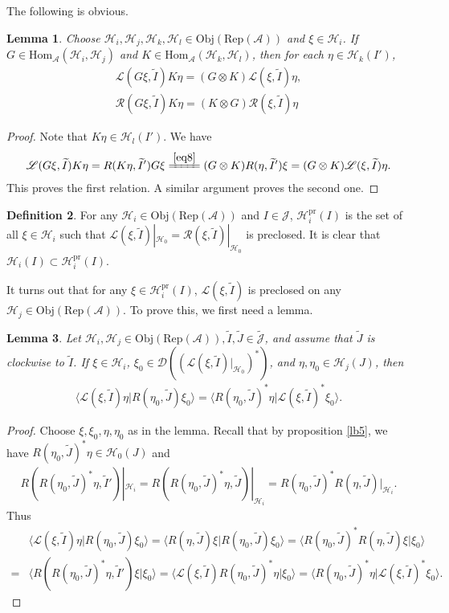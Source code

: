\documentclass[12pt,a4paper]{article}
\theoremstyle{definition}
\newtheorem{df}{Definition}[section]
\theoremstyle{plain}
\newtheorem{lm}[df]{Lemma}
\newcommand{\mc}{\mathcal}
\newcommand{\wtd}{\widetilde}
\newcommand{\Hom}{\mathrm{Hom}}
\newcommand{\Dom}{\scr D}
\newcommand{\bk}[1]{\langle {#1}\rangle}
\newcommand{\scr}{\mathscr}
\newcommand{\Jtd}{\widetilde{\mathcal J}}
\newcommand{\RepA}{\mathrm{Rep}(\mc A)}
\newcommand{\Obj}{\mathrm{Obj}}
\newcommand{\pr}{\mathrm{pr}}
\numberwithin{equation}{section}
\begin{document}
The following is obvious.

\begin{lm}
Choose $\mc H_i,\mc H_j,\mc H_k,\mc H_l\in\Obj(\RepA)$ and $\xi\in\mc H_i$. If $G\in\Hom_{\mc A}(\mc H_i,\mc H_j)$ and $K\in\Hom_{\mc A}(\mc H_k,\mc H_l)$, then for each $\eta\in\mc H_k(I')$,
\begin{gather}
	\scr L(G\xi,\wtd I)K\eta=(G\otimes K)\scr L(\xi,\wtd I)\eta,\label{eq68}\\
\scr R(G\xi,\wtd I)K\eta=(K\otimes G)\scr R(\xi,\wtd I)\eta
\end{gather}
\end{lm}
\begin{proof}
Note that $K\eta\in\mc H_l(I')$. We have
\begin{align*}
\scr L(G\xi,\wtd I)K\eta=R(K\eta,\wtd I')G\xi\xlongequal{\eqref{eq8}} (G\otimes K) R(\eta,\wtd I')\xi=(G\otimes K)\scr L(\xi,\wtd I)\eta.
\end{align*}
This proves the first relation. A similar argument proves the second one.
\end{proof}



\begin{df}
For any $\mc H_i\in\Obj(\RepA)$ and $I\in\mc J$,  $\mc H_i^\pr(I)$  is the set of all $\xi\in\mc H_i$ such that $\scr L(\xi,\wtd I)|_{\mc H_0}=\scr R(\xi,\wtd I)|_{\mc H_0}$ is preclosed. It is clear that $\mc H_i(I)\subset\mc H_i^\pr(I)$.
\end{df}

It turns out that for any $\xi\in\mc H_i^\pr(I)$, $\scr L(\xi,\wtd I)$ is preclosed on any $\mc H_j\in\Obj(\RepA)$. To prove this, we first need a lemma.

\begin{lm}
Let $\mc H_i,\mc H_j\in\Obj(\RepA),\wtd I,\wtd J\in\Jtd$, and assume that $\wtd J$ is clockwise  to $\wtd I$. If $\xi\in\mc H_i$, $\xi_0\in\Dom((\scr L(\xi,\wtd I)|_{\mc H_0})^*)$, and $\eta,\eta_0\in\mc H_j(J)$, then
\begin{align}
\bk{\scr L(\xi,\wtd I)\eta|R(\eta_0,\wtd J)\xi_0}=\bk{R(\eta_0,\wtd J)^*\eta|\scr L(\xi,\wtd I)^*\xi_0}.\label{eq45}
\end{align}	
\end{lm}

\begin{proof}
Choose $\xi,\xi_0,\eta,\eta_0$ as in the lemma.  Recall that by proposition \ref{lb5}, we have $R(\eta_0,\wtd J)^*\eta\in\mc H_0(J)$ and
\begin{gather*}
R(R(\eta_0,\wtd J)^*\eta,\wtd I')|_{\mc H_i}=R(R(\eta_0,\wtd J)^*\eta,\wtd J)|_{\mc H_i}=R(\eta_0,\wtd J)^*R(\eta,\wtd J)|_{\mc H_i}.
\end{gather*}
Thus
\begin{align*}
&\bk{\scr L(\xi,\wtd I)\eta|R(\eta_0,\wtd J)\xi_0}=\bk{R(\eta,\wtd J)\xi|R(\eta_0,\wtd J)\xi_0}=\bk{R(\eta_0,\wtd J)^*R(\eta,\wtd J)\xi|\xi_0}\\
=&\bk{R(R(\eta_0,\wtd J)^*\eta,\wtd I')\xi|\xi_0}=\bk{\scr L(\xi,\wtd I)R(\eta_0,\wtd J)^*\eta|\xi_0}=\bk{R(\eta_0,\wtd J)^*\eta|\scr L(\xi,\wtd I)^*\xi_0}.
\end{align*}
\end{proof}
\end{document}
